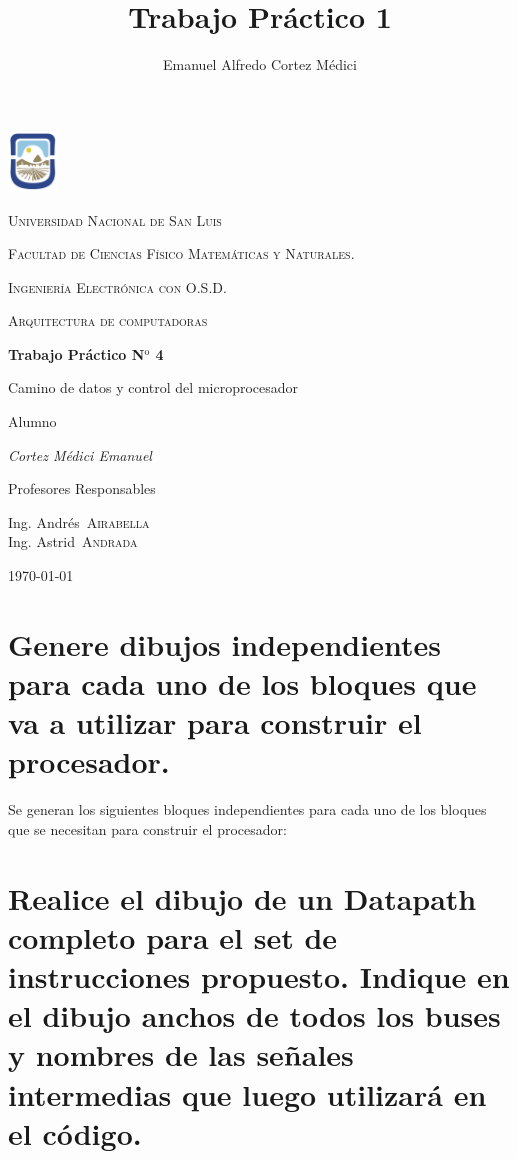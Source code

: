 \documentclass[11pt,a4paper]{article}
\author{Emanuel Alfredo Cortez Médici}
\title{Trabajo Práctico 1}
\begin{document}
	\begin{titlepage}
	\centering
	
	\includegraphics[width=0.1\textwidth]{fotos/unsl.png} 
	
	{\scshape\LARGE Universidad Nacional de San Luis\par}
	{\scshape Facultad de Ciencias Físico Matemáticas y Naturales.\par}
	{\scshape Ingeniería Electrónica con O.S.D.\par}
	\vspace{1.5cm}
	{\scshape\Large Arquitectura de computadoras \par}
	\vspace{1.5cm}
	{\huge\bfseries Trabajo Práctico N$^{\text{o}}$ 4
	
    Camino de datos y control del microprocesador\par}
	\vspace{2cm}
	Alumno\par
	{\Large\itshape 	
	Cortez Médici Emanuel\par}
	\vfill
	Profesores Responsables\par
	Ing. Andrés~\textsc{Airabella}\\
	Ing. Astrid~\textsc{Andrada}
	
	\vfill

	{\large \today\par}
\end{titlepage}

\newpage

\section{Genere dibujos independientes para cada uno de los bloques que va a utilizar para
construir el procesador.}

Se generan los siguientes bloques independientes para cada uno de los bloques que se necesitan para construir el procesador:


\section{Realice el dibujo de un Datapath completo para el set de instrucciones propuesto.
Indique en el dibujo anchos de todos los buses y nombres de las señales
intermedias que luego utilizará en el código.}
\end{document}
